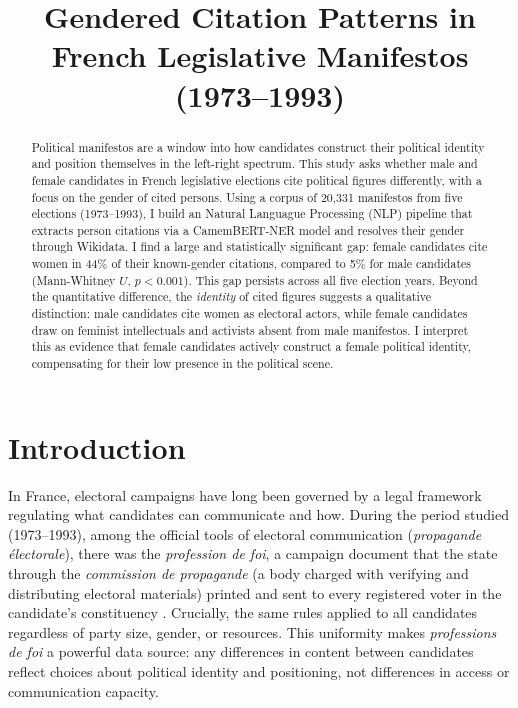 \documentclass{article}
\title{Gendered Citation Patterns in French Legislative Manifestos (1973--1993)}
\begin{document}
\maketitle

\begin{abstract}
Political manifestos are a window into how candidates construct their political identity and position themselves in the left-right spectrum. This study asks whether male and female candidates in French legislative elections cite political figures differently, with a focus on the gender of cited persons. Using a corpus of 20,331 manifestos from five elections (1973--1993), I build an Natural Languague Processing (NLP) pipeline that extracts person citations via a CamemBERT-NER model and resolves their gender through Wikidata. I find a large and statistically significant gap: female candidates cite women in 44\% of their known-gender citations, compared to 5\% for male candidates (Mann-Whitney $U$, $p < 0.001$). This gap persists across all five election years. Beyond the quantitative difference, the \emph{identity} of cited figures suggests a qualitative distinction: male candidates cite women as electoral actors, while female candidates draw on feminist intellectuals and activists absent from male manifestos. I interpret this as evidence that female candidates actively construct a female political identity, compensating for their low presence in the political scene.
\end{abstract}


\section{Introduction}

In France, electoral campaigns have long been governed by a legal framework regulating what candidates can communicate and how. During the period studied (1973--1993), among the official tools of electoral communication (\emph{propagande électorale}), there was the \emph{profession de foi}, a campaign document that the state through the \emph{commission de propagande} (a body charged with verifying and distributing electoral materials) printed and sent to every registered voter in the candidate's constituency \cite{gaultier2022}. Crucially, the same rules applied to all candidates regardless of party size, gender, or resources. This uniformity makes \emph{professions de foi} a powerful data source: any differences in content between candidates reflect choices about political identity and positioning, not differences in access or communication capacity.
\end{document}

